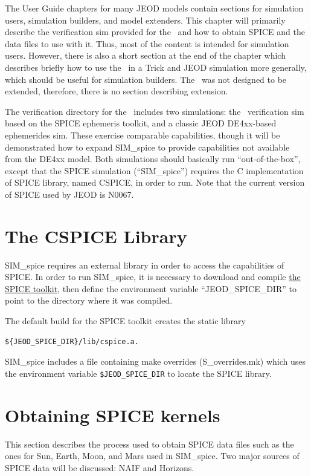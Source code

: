 The User Guide chapters for many JEOD models contain sections for simulation
users, simulation builders, and model extenders.  This chapter will primarily
describe the verification sim provided for the \SpiceDesc\ and how to obtain
SPICE and the data files to use with it.  Thus, most of the content is
intended for simulation users.  However, there is also a short section at the
end of the chapter which describes briefly how to use the \SpiceDesc\ in a
Trick and JEOD simulation more generally, which should be useful for simulation
builders. The \SpiceDesc\ was not designed to be extended, therefore, there is
no section describing extension.

The verification directory for the \SpiceDesc\ includes two simulations: the
\SpiceDesc\ verification sim based on the SPICE ephemeris toolkit, and a
classic JEOD DE4xx-based ephemerides sim. These exercise comparable
capabilities, though it will be demonstrated how to expand SIM\_spice to
provide capabilities not available from the DE4xx model. Both simulations
should basically run ``out-of-the-box'', except that the SPICE simulation
(``SIM\_spice'') requires the C implementation of SPICE library, named CSPICE,
in order to run. Note that the current version of SPICE used by JEOD is N0067.


\section {The CSPICE Library}
SIM\_spice requires an external library in order to access the capabilities of
SPICE. In order to run SIM\_spice, it is necessary to download and compile
\href{https://naif.jpl.nasa.gov/naif/toolkit.html}{the SPICE toolkit}, then
define the environment variable ``JEOD\_SPICE\_DIR'' to point to the directory
where it was compiled.

The default build for the SPICE toolkit creates the static library
\begin{verbatim}
${JEOD_SPICE_DIR}/lib/cspice.a.
\end{verbatim}
SIM\_spice includes a file containing make overrides (S\_overrides.mk) which
uses the environment variable \verb|$JEOD_SPICE_DIR| to locate the SPICE library.


\section{Obtaining SPICE kernels}
This section describes the process used to obtain SPICE data files such as
the ones for Sun, Earth, Moon, and Mars used in SIM\_spice.  Two major sources
of SPICE data will be discussed: NAIF and Horizons.


